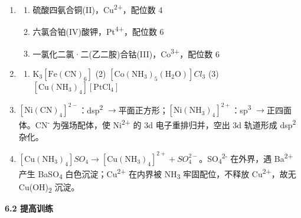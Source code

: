 \documentclass[a4paper,11pt]{ctexart}
\providecommand{\tightlist}{\setlength{\itemsep}{0pt}\setlength{\parskip}{0pt}}
\newcommand{\箭}{\ensuremath{\rightarrow}}
\newcommand{\左箭}{\ensuremath{\leftarrow}}
\newcommand{\上箭}{\ensuremath{\uparrow}}
\newcommand{\下箭}{\ensuremath{\downarrow}}
\newcommand{\衡}{\ensuremath{\rightleftharpoons}}
\newcommand{\双箭}{\ensuremath{\leftrightarrow}}
\newcommand{\约等于}{\ensuremath{\approx}}
\newcommand{\小于等于}{\ensuremath{\leq}}
\newcommand{\大于等于}{\ensuremath{\geq}}
\newcommand{\不等于}{\ensuremath{\neq}}
\newcommand{\西格马}{\ensuremath{\sigma}}
\newcommand{\派}{\ensuremath{\pi}}
\begin{document}
\begin{enumerate}
\def\labelenumi{\arabic{enumi}.}
\item
  \begin{enumerate}
  \def\labelenumii{(\arabic{enumii})}
  \tightlist
  \item
    硫酸四氨合铜(II)，Cu\textsuperscript{2+}，配位数 4
  \item
    六氯合铂(IV)酸钾，Pt\textsuperscript{4+}，配位数 6
  \item
    一氯化二氯·二(乙二胺)合钴(III)，Co\textsuperscript{3+}，配位数 6
  \end{enumerate}
\item
  \begin{enumerate}
  \def\labelenumii{(\arabic{enumii})}
  \tightlist
  \item
    \(\mathrm{K_3[Fe(CN)_6]}\) (2) \([\mathrm{Co(NH_3)_5(H_2O)}]Cl_3\) (3) \([\mathrm{Cu(NH_3)_4}][\mathrm{PtCl_4}]\)
  \end{enumerate}
\item
  \([\mathrm{Ni(CN)_4}]^{2-}\)：dsp\textsuperscript{2} \箭 平面正方形；\([\mathrm{Ni(NH_3)_4}]^{2+}\)：sp\textsuperscript{3} \箭 正四面体。CN\textsuperscript{-} 为强场配体，使 Ni\textsuperscript{2+} 的 3d 电子重排归并，空出 3d 轨道形成 dsp\textsuperscript{2} 杂化。
\item
  \([\mathrm{Cu(NH_3)_4}]SO_4 \rightarrow [\mathrm{Cu(NH_3)_4}]^{2+} + SO_4^{2-}\)。SO\textsubscript{4}\textsuperscript{2-} 在外界，遇 Ba\textsuperscript{2+} 产生 BaSO\textsubscript{4} 白色沉淀；Cu\textsuperscript{2+} 在内界被 NH\textsubscript{3} 牢固配位，不释放 Cu\textsuperscript{2+}，故无 Cu(OH)\textsubscript{2} 沉淀。
\end{enumerate}

\textbf{6.2 提高训练}
\end{document}
